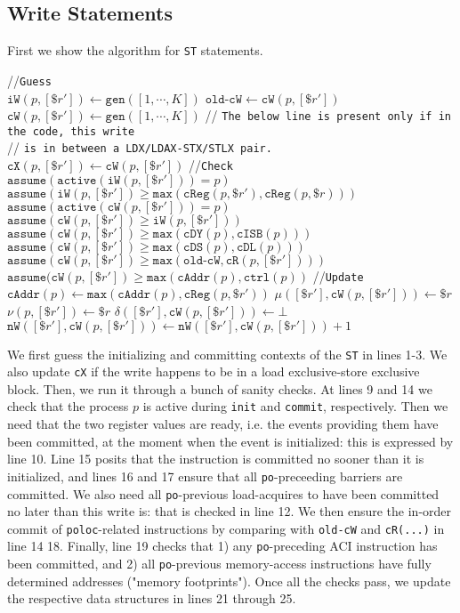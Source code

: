 \documentclass{article}
\newcommand{\var}{\texttt}
\begin{document}
\subsection{Write Statements}
First we show the algorithm for \var{ST} statements.\\
\begin{algorithm}[H]
  \SetAlgoLined
  //\var{Guess}\\
  $\var{iW}(p,[\$r']) \gets \var{gen}([1,\cdots,K])$\;
  $\var{old-cW} \gets \var{cW}(p,[\$r'])$\;
  $\var{cW}(p,[\$r']) \gets \var{gen}([1,\cdots,K])$\;
  // \var{The below line is present only if in the code, this write}\\
  // \var{is in between a LDX/LDAX-STX/STLX pair.}\\
  $\var{cX}(p,[\$r']) \gets \var{cW}(p,[\$r'])$\;
  //\var{Check}\\
  $\var{assume}(\var{active}(\var{iW}(p,[\$r'])) = p)$\;
  $\var{assume}(\var{iW}(p,[\$r']) \geq \var{max}(\var{cReg}(p,\$r'),\var{cReg}(p,\$r)))$\;
  \For{$\$r \in \mathcal{R}$}{
    $\var{assume}(\var{cW}(p,[\$r']) \geq \var{cL}(p,\$r))$\;
  }
  $\var{assume}(\var{active}(\var{cW}(p,[\$r'])) = p)$\;
  $\var{assume}(\var{cW}(p,[\$r']) \geq \var{iW}(p,[\$r']))$\;
  $\var{assume}(\var{cW}(p,[\$r']) \geq \var{max}(\var{cDY}(p), \var{cISB}(p)))$\;
  $\var{assume}(\var{cW}(p,[\$r']) \geq \var{max}(\var{cDS}(p),\var{cDL}(p)))$\;
  $\var{assume}(\var{cW}(p,[\$r']) \geq \var{max}(\var{old-cW},\var{cR}(p,[\$r'])))$\;
  $\var{assume}(\var{cW}(p,[\$r']) \geq \var{max}(\var{cAddr}(p),\var{ctrl}(p))$\;
  //\var{Update}\\
  $\var{cAddr}(p) \gets \var{max}(\var{cAddr}(p), \var{cReg}(p,\$r'))$\;
  $\mu([\$r'],\var{cW}(p,[\$r'])) \gets \$r$\;
  $\nu(p,[\$r']) \gets \$r$\;
  $\delta([\$r'],\var{cW}(p,[\$r'])) \gets \bot$\;
  $\var{nW}([\$r'],\var{cW}(p,[\$r'])) \gets \var{nW}([\$r'],\var{cW}(p,[\$r'])) + 1$\;
  \caption{$\llbracket \var{ST } [\$r'] \leftarrow \$r \rrbracket_K^{p,\var{ST}}$}
\end{algorithm}
We first guess the initializing and committing contexts of the \var{ST} in lines 1-3. We also update \var{cX} if the write happens to be in a load exclusive-store exclusive block. Then, we run it through a bunch of sanity checks. At lines 9 and 14 we check that the process $p$ is active during \var{init} and \var{commit}, respectively. Then we need that the two register values are ready, i.e. the events providing them have been committed, at the moment when the event is initialized: this is expressed by line 10. Line 15 posits that the instruction is committed no sooner than it is initialized, and lines 16 and 17 ensure that all \var{po}-preceeding barriers are committed. We also need all \var{po}-previous load-acquires to have been committed no later than this write is: that is checked in line 12. We then ensure the in-order commit of \var{poloc}-related instructions by comparing with \var{old-cW} and \var{cR(...)} in line 14 18. Finally, line 19 checks that 1) any \var{po}-preceding ACI instruction has been committed, and 2) all \var{po}-previous memory-access instructions have fully determined addresses ("memory footprints"). Once all the checks pass, we update the respective data structures in lines 21 through 25.\\
\end{document}
